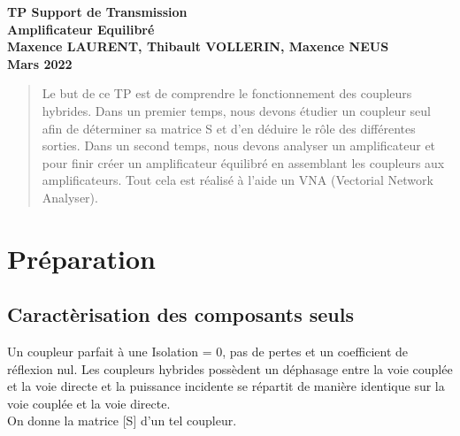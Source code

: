 \documentclass[oneside,a4paper,12pt]{article}
\begin{document}
	\begin{titlepage}
		\hspace*{\fill}
		
		\begin{center}
			\vspace{1cm}
			\textbf{TP Support de Transmission}\\
			\textbf{Amplificateur Equilibré}\\
			\vspace{1cm}
			\textbf{Maxence LAURENT, Thibault VOLLERIN, Maxence NEUS}\\
			\vspace{3cm}
			\vspace{\fill}
			\textbf{Mars 2022}\\
		\end{center}
	\end{titlepage}
	
	\tableofcontents
	
	\vspace{5cm}
	
	\begin{abstract}
	Le but de ce TP est de comprendre le fonctionnement des coupleurs hybrides. Dans un premier temps, 
	nous devons étudier un coupleur seul afin de déterminer sa matrice S et d’en déduire le rôle des différentes sorties. 
	Dans un second temps, nous devons analyser un amplificateur et pour finir créer un amplificateur équilibré en assemblant les coupleurs aux amplificateurs. 
	Tout cela est réalisé à l’aide un VNA (Vectorial Network Analyser).
 	\end{abstract}

	\newpage

	\section{Préparation}
	\subsection{Caractèrisation des composants seuls}
	Un coupleur parfait à une Isolation = 0, pas de pertes et un coefficient de réflexion nul.
	Les coupleurs hybrides possèdent un déphasage entre la voie couplée et la voie directe et 
	la puissance incidente se répartit de manière identique sur la voie couplée et la voie directe.\\
	On donne la matrice [S] d'un tel coupleur.
\end{document}
